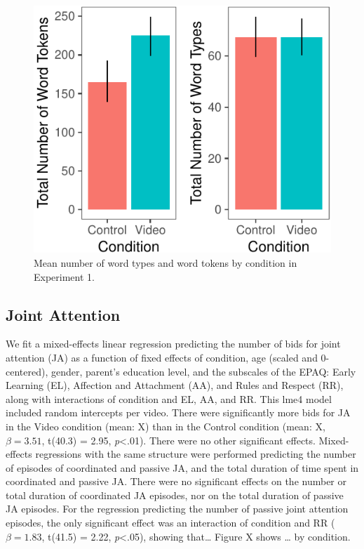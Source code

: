 \documentclass[10pt, letterpaper]{article}
\newenvironment{CodeChunk}{}{}
\begin{document}
\begin{CodeChunk}
\begin{figure}[H]

{\centering \includegraphics{figs/e1token_type-1} 

}

\caption[Mean number of word types and word tokens by condition in Experiment 1]{Mean number of word types and word tokens by condition in Experiment 1.}\label{fig:e1token_type}
\end{figure}
\end{CodeChunk}

\subsection{Joint Attention}\label{joint-attention}

We fit a mixed-effects linear regression predicting the number of bids
for joint attention (JA) as a function of fixed effects of condition,
age (scaled and 0-centered), gender, parent's education level, and the
subscales of the EPAQ: Early Learning (EL), Affection and Attachment
(AA), and Rules and Respect (RR), along with interactions of condition
and EL, AA, and RR. This lme4 model included random intercepts per
video. There were significantly more bids for JA in the Video condition
(mean: X) than in the Control condition (mean: X, \(\beta=3.51\),
t(40.3) = 2.95, \emph{p}\textless{}.01). There were no other significant
effects. Mixed-effects regressions with the same structure were
performed predicting the number of episodes of coordinated and passive
JA, and the total duration of time spent in coordinated and passive JA.
There were no significant effects on the number or total duration of
coordinated JA episodes, nor on the total duration of passive JA
episodes. For the regression predicting the number of passive joint
attention episodes, the only significant effect was an interaction of
condition and RR (\(\beta=1.83\), t(41.5) = 2.22,
\emph{p}\textless{}.05), showing that\ldots{} Figure X shows \ldots{} by
condition.
\end{document}

